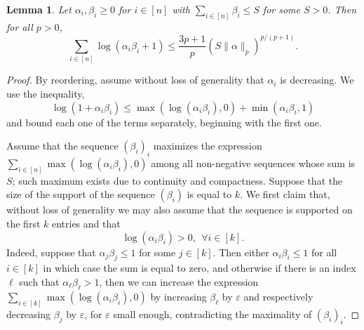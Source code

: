 \documentclass[12pt]{article}
\def \eps {\varepsilon}
\newtheorem{lemma}[theorem]{Lemma}
\theoremstyle{definition}
\theoremstyle{remark}
\begin{document}
\begin{lemma} \label{lem:annoyingbound}
Let $\alpha_i, \beta_i \geq 0$ for $i \in [n]$ with $\sum_{i \in [n]} \beta_i \leq S$ for some $S>0$. Then for all $p>0$,
\begin{equation}\label{eq:lemmax}
\sum_{i \in [n]} \log (\alpha_i \beta_i + 1) \leq \frac{3 p+1}{p} \left (S \| \alpha \|_p \right )^{p/(p+1)}.
\end{equation}
\end{lemma}
\begin{proof}
By reordering, assume without loss of generality that $\alpha_i$ is decreasing.  We use the inequality,
\begin{equation}\label{eq:sumbound}
\log(1+\alpha_i \beta_i) \leq \max(\log(\alpha_i \beta_i),0) + \min(\alpha_i \beta_i, 1)
\end{equation}
and bound each one of the terms separately, beginning with the first one.

Assume that the sequence $(\beta_i)_i$ maximizes the expression $\sum_{i \in [n]} \max(\log (\alpha_i \beta_i), 0)$ among all non-negative sequences whose sum is $S$; such maximum exists due to continuity and compactness. Suppose that the size of the support of the sequence $(\beta_i)$ is equal to $k$. We first claim that, without loss of generality we may also assume that the sequence is supported on the first $k$ entries and that
$$
\log (\alpha_i \beta_i) > 0, ~~ \forall i \in [k].
$$
Indeed, suppose that $\alpha_j \beta_j \leq 1$ for some $j \in [k]$. Then either $\alpha_i \beta_i \leq 1$ for all $i \in [k]$ in which case the sum is equal to zero, and otherwise if there is an index $\ell$ such that $\alpha_\ell \beta_\ell > 1$, then we can increase the expression $\sum_{i \in [k]} \max(\log(\alpha_i \beta_i),0)$ by increasing $\beta_\ell$ by $\eps$ and respectively decreasing $\beta_j$ by $\eps$, for $\eps$ small enough, contradicting the maximality of $(\beta_i)_i$.


\end{proof}
\end{document}
